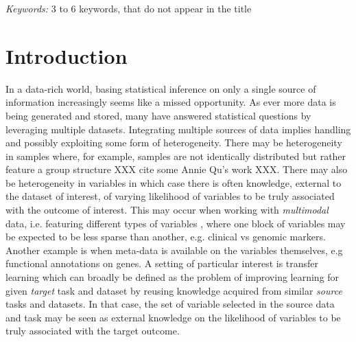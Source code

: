\documentclass[
  12pt]{article}
\begin{document}
\noindent%
{\it Keywords:} 3 to 6 keywords, that do not appear in the title
\vfill

\newpage
{} %


\maketitle

\section{Introduction}

In a data-rich world, basing statistical inference on only a single source of information increasingly seems like a missed opportunity. As ever more data is being generated and stored, many have answered statistical questions by 
leveraging multiple datasets. Integrating multiple sources of data implies handling and possibly exploiting some form of heterogeneity. There may be heterogeneity in samples where, for example, samples are not identically distributed but rather feature a group structure XXX cite some Annie Qu's work XXX. There may also be heterogeneity in variables in which case there is often knowledge, external to the dataset of interest, of varying likelihood of variables to be truly associated with the outcome of interest. This may occur when working with \textit{multimodal} data, i.e. featuring different types of variables \cite{}, where one block of variables may be expected to be less sparse than another, e.g. clinical vs genomic markers. Another example is when meta-data is available on the variables themselves, e.g functional annotations on genes. A setting of particular interest is transfer learning which 
can broadly be defined as the problem of improving learning for given \textit{target} task and dataset by reusing knowledge acquired from similar \textit{source} tasks and datasets. In that case, the set of variable selected in the source data and task may be seen as external knowledge on the likelihood of variables to be truly associated with the target outcome.
\end{document}
